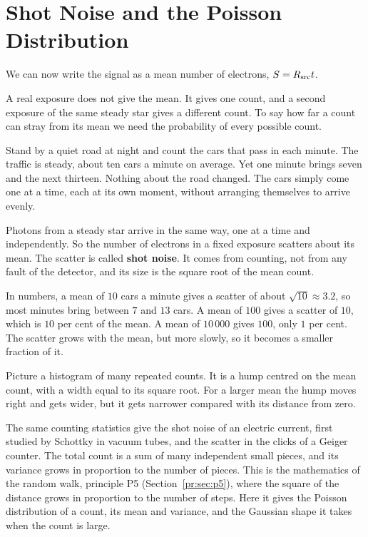 \section{Shot Noise and the Poisson Distribution}
\label{cc:sec:poisson}

We can now write the signal as a mean number of electrons, $S=R_{\rm src}t$.

A real exposure does not give the mean. It gives one count, and a second exposure of the same steady star gives a different count. To say how far a count can stray from its mean we need the probability of every possible count.

Stand by a quiet road at night and count the cars that pass in each minute. The traffic is steady, about ten cars a minute on average. Yet one minute brings seven and the next thirteen. Nothing about the road changed. The cars simply come one at a time, each at its own moment, without arranging themselves to arrive evenly.

Photons from a steady star arrive in the same way, one at a time and independently. So the number of electrons in a fixed exposure scatters about its mean. The scatter is called \textbf{shot noise}. It comes from counting, not from any fault of the detector, and its size is the square root of the mean count.

In numbers, a mean of $10$ cars a minute gives a scatter of about $\sqrt{10}\approx3.2$, so most minutes bring between $7$ and $13$ cars. A mean of $100$ gives a scatter of $10$, which is $10$ per cent of the mean. A mean of $10\,000$ gives $100$, only $1$ per cent. The scatter grows with the mean, but more slowly, so it becomes a smaller fraction of it.

Picture a histogram of many repeated counts. It is a hump centred on the mean count, with a width equal to its square root. For a larger mean the hump moves right and gets wider, but it gets narrower compared with its distance from zero.

The same counting statistics give the shot noise of an electric current, first studied by Schottky in vacuum tubes, and the scatter in the clicks of a Geiger counter. The total count is a sum of many independent small pieces, and its variance grows in proportion to the number of pieces. This is the mathematics of the random walk, principle P5 (Section~\ref{pr:sec:p5}), where the square of the distance grows in proportion to the number of steps. Here it gives the Poisson distribution of a count, its mean and variance, and the Gaussian shape it takes when the count is large.

